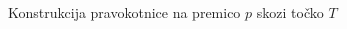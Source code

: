 \begin{frame}{Konstrukcija pravokotnice na premico $p$ skozi točko $T$}
\begin{columns}
\begin{column}{0.45\textwidth}
\begin{tikzpicture}
					
					
					
				\end{tikzpicture}
	   \end{column}
	\end{columns}

\end{frame}


